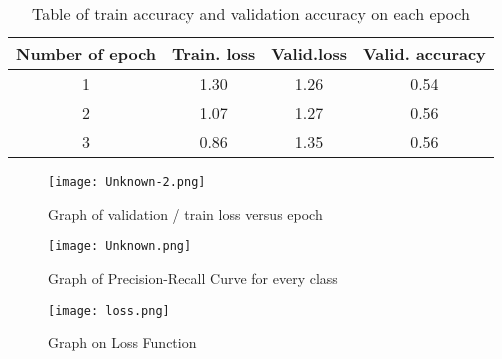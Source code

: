 \documentclass{article}
\begin{document}
\begin{table}[bhtp]
	\centering
	\caption{Table of train accuracy and validation accuracy on each epoch}
	\label{tbl:space_and_subspace}
	\begin{tabular}{| c | c | c | c | }
		\hline
		Number of epoch & Train. loss & Valid.loss & Valid. accuracy \\
		\hline
		1 & 1.30  & 1.26 & 0.54  \\
        \hline
		2 & 1.07 & 1.27 & 0.56  \\
		\hline
        3 & 0.86  & 1.35 & 0.56  \\
        \hline
	\end{tabular}
\end{table}

\begin{figure}[bhtp]
	\texttt{[image: Unknown-2.png]}
	\caption{Graph of validation / train loss versus epoch}
	\label{fig:1}
\end{figure}


\begin{figure}[bhtp]
	\texttt{[image: Unknown.png]}
	\caption{Graph of Precision-Recall Curve for every class}
	\label{fig:2}
\end{figure}


\begin{figure}[bhtp]
	\texttt{[image: loss.png]}
	\caption{Graph on Loss Function}
	\label{fig:3}
\end{figure}





\end{document}
